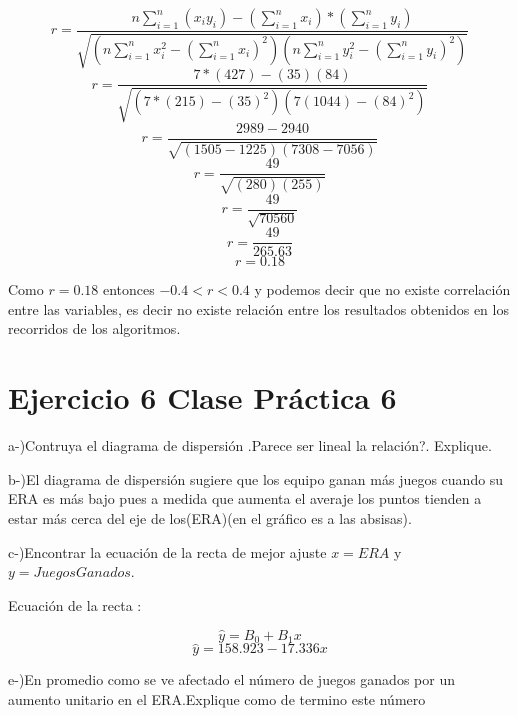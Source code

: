 \documentclass{article}
\begin{document}
		$$r = \frac{n\sum_{i=1}^{n}\left(x_{i}y_{i}\right)-\left(\sum_{i=1}^{n}x_{i}\right)*\left(\sum_{i=1}^{n}y_{i}\right)}{\sqrt{\left(n\sum_{i=1}^{n}x_{i}^{2} - \left(\sum_{i=1}^{n}x_{i}\right)^2\right)\left(n\sum_{i=1}^{n}y_{i}^{2} - \left(\sum_{i=1}^{n}y_{i}\right)^2\right)}}$$
		$$r = \frac{7*\left(427\right)-\left(35\right)\left(84\right)}{\sqrt{\left(7*\left(215\right)-\left(35\right)^2\right)\left(7\left(1044\right)-\left(84\right)^2\right)}}$$
		$$r = \frac{2989 - 2940}{\sqrt{\left(1505 - 1225\right)\left(7308 - 7056\right)}}$$
		$$r = \frac{49}{\sqrt{\left(280\right)\left(255\right)}}$$
		$$r = \frac{49}{\sqrt{70560}}$$
		$$r = \frac{49}{265.63}$$
		$$r = 0.18$$

		\begin{flushleft}
			Como $r = 0.18$ entonces $-0.4 < r < 0.4$ y podemos decir que no existe correlaci\'on entre las variables, es decir no existe relaci\'on entre los resultados obtenidos en los recorridos de los algoritmos.
		\end{flushleft}
	
	\section*{Ejercicio 6 Clase Pr\'actica 6 }

		\begin{flushleft}
			a-)Contruya el diagrama de dispersi\'on .Parece ser lineal la relaci\'on?. Explique.
		\end{flushleft}

		\begin{flushleft}
			b-)El diagrama de dispersi\'on sugiere que los equipo ganan m\'as juegos cuando su ERA es m\'as bajo pues a medida que aumenta el averaje los puntos tienden a estar m\'as cerca del eje de los(ERA)(en el gr\'afico es a las absisas).
		\end{flushleft}

		\begin{flushleft}
			c-)Encontrar la ecuaci\'on de la recta de mejor ajuste $x = ERA$ y $y = Juegos Ganados$.
		\end{flushleft}

		\begin{flushleft}
			Ecuaci\'on de la recta :
		\end{flushleft}
		$$ \hat y = B_{0} + B_{1}x$$
		$$ \hat y = 158.923 - 17.336 x$$

		\begin{flushleft}
			e-)En promedio como se ve afectado el n\'umero de juegos ganados por un aumento unitario en el ERA.Explique como de termino este n\'umero 
		\end{flushleft}
\end{document}
